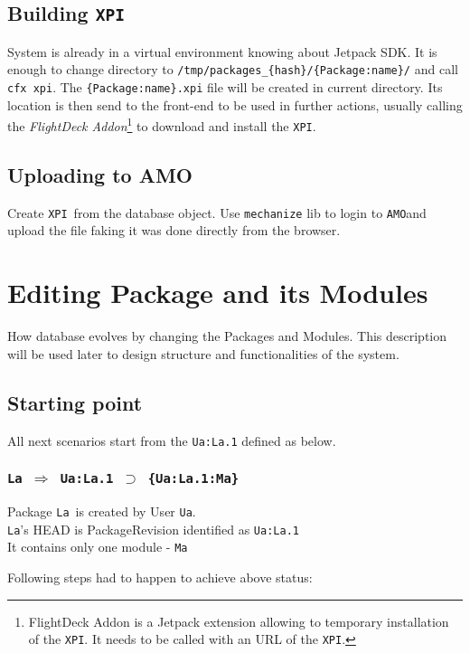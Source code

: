 \documentclass[10pt]{article}
\def\Ua{{\tt Ua}}
\def\La{{\tt La}}
\def\Ma{{\tt Ma}}
\def\xpi{{\tt XPI}}
\def\amo{{\tt AMO}}
\def\headsto{${\Longrightarrow}$ }
\def\hto{\headsto}
\def\eq{${\supset}$ }
\begin{document}
	\subsection{Building \xpi}
	
		System is already in a virtual environment knowing about Jetpack SDK. It is enough to change 
		directory to {\tt /tmp/packages\_\{hash\}/\{Package:name\}/} and call {\tt cfx xpi}. The 
		{\tt \{Package:name\}.xpi} file will be created in current directory. Its location is then send
		to the front-end to be used in further actions, usually calling the {\em FlightDeck Addon}\footnote{
		FlightDeck Addon is a Jetpack extension allowing to temporary installation of the \xpi. It 
		needs to be called with an URL of the \xpi.} to download and install the \xpi.
	
	\subsection{Uploading to AMO}
	
		Create \xpi\ from the database object. Use {\tt mechanize} lib to login to \amo and upload the 
		file faking it was done directly from the browser.
							
\section{Editing Package and its Modules}

	How database evolves by changing the Packages and Modules. This description will be used later to design 
	structure and functionalities of the system.

	\subsection{Starting point}
		\noindent All next scenarios start from the {\tt Ua:La.1} defined as below.
		\subsubsection*{{\tt La \hto  Ua:La.1 \eq \{Ua:La.1:Ma\}}}
			Package \La\ is created by User \Ua.\\
			\La's HEAD is PackageRevision identified as {\tt Ua:La.1}\\
			It contains only one module - \Ma
			
			\noindent Following steps had to happen to achieve above status:
\end{document}
